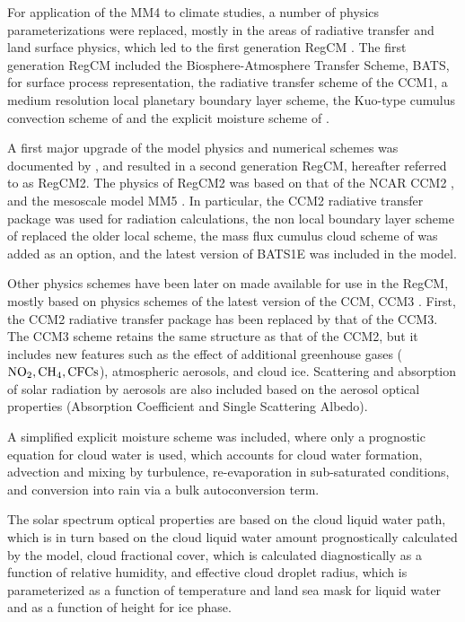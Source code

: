 For application of the \ac{MM4} to climate studies, a number of physics
parameterizations were replaced, mostly in the areas of radiative transfer and
land surface physics, which led to the first generation \ac{RegCM}
\citep{Dickinson_89,Giorgi_90}. The first generation \ac{RegCM} included the
Biosphere-Atmosphere Transfer Scheme, BATS, \citep{Dickinson_86} for surface
process representation, the radiative transfer scheme of the \ac{CCM1}, a medium
resolution local planetary boundary layer scheme, the Kuo-type cumulus
convection scheme of \citep{Anthes_77} and the explicit moisture scheme of
\citep{Hsie_84}.

A first major upgrade of the model physics and numerical schemes was documented
by \citep{Giorgi_93,Giorgi_93b}, and resulted in a second generation \ac{RegCM},
hereafter referred to as \ac{RegCM2}. The physics of \ac{RegCM2} was based on
that of the \ac{NCAR} \ac{CCM2} \citep{Hack_93}, and the mesoscale model
\ac{MM5} \citep{Grell_94}. In particular, the \ac{CCM2} radiative transfer
package \citep{Briegleb_92} was used for radiation calculations, the non local
boundary layer scheme of \citep{Holtslag_90} replaced the older local scheme,
the mass flux cumulus cloud scheme of \citep{Grell_93} was added as an option,
and the latest version of BATS1E \citep{Dickinson_93} was included in the model.

Other physics schemes have been later on made available for use in
the \ac{RegCM}, mostly based on physics schemes of the latest version of the
\ac{CCM}, \ac{CCM3} \citep{Kiehl_96}. First, the \ac{CCM2} radiative transfer
package has been replaced by that of the \ac{CCM3}.
The \ac{CCM3} scheme retains the same structure
as that of the \ac{CCM2}, but it includes new features such as the effect of
additional greenhouse gases (${\rm NO_2, CH_4, CFCs}$), atmospheric aerosols,
and cloud ice. Scattering and absorption of solar radiation by aerosols are
also included based on the aerosol optical properties (Absorption Coefficient
and Single Scattering Albedo).
 
A simplified explicit moisture scheme \citet{Hsie_84} was included, where only a
prognostic equation for cloud water is used, which accounts for cloud water
formation, advection and mixing by turbulence, re-evaporation in sub-saturated
conditions, and conversion into rain via a bulk autoconversion term.

The solar spectrum optical properties are based on the cloud liquid water path,
which is in turn based on the cloud liquid water amount prognostically
calculated by the model, cloud fractional cover, which is calculated
diagnostically as a function of relative humidity, and effective cloud droplet
radius, which is parameterized as a function of temperature and land sea mask
for liquid water and as a function of height for ice phase.

